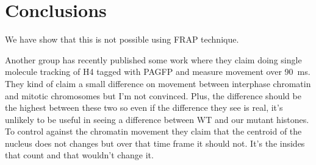 
\section{Conclusions}
  We have show that this is not possible using FRAP technique.

  
  Another group has recently
  published some work where they claim doing single molecule tracking of H4 tagged with PAGFP
  and measure movement over \SI{90}{\ms}. They kind of claim
  a small difference on movement between interphase chromatin and mitotic chromosomes but
  I'm not convinced. Plus, the difference should be the highest between these two so even if
  the difference they see is real, it's unlikely to be useful in seeing a difference between
  WT and our mutant histones. To control against the chromatin movement they claim that the
  centroid of the nucleus does not changes but over that time frame it should not. It's the
  insides that count and that wouldn't change it.

